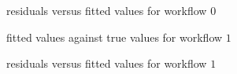 \documentclass{article}
\begin{document}
\begin{figure}[!htbp]
\centering
{}
\caption{residuals versus fitted values for workflow $0$} \label{1d_02}
\end{figure}

\begin{figure}[!htbp]
\centering
{}
\caption{fitted values against true values for workflow $1$} \label{1d_11}
\end{figure}

\begin{figure}[!htbp]
\centering
{}
\caption{residuals versus fitted values for workflow $1$} \label{1d_12}
\end{figure}
\end{document}
